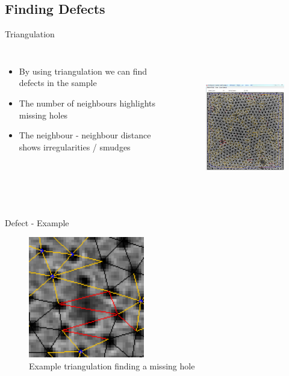 \documentclass{beamer}
\begin{document}
\subsection{Finding Defects}
\begin{frame}{Triangulation}
	\begin{columns}
			\begin{itemize}
				\item
				By using triangulation we can find defects in the sample
				\item
				The number of neighbours highlights missing holes
				\item
				The neighbour - neighbour distance shows irregularities / smudges
			\end{itemize}
			\begin{figure}
				\includegraphics[height=175pt]{images/triangulation.PNG}
			\end{figure}
	\end{columns}

\end{frame}

\begin{frame}{Defect - Example}
	\begin{figure}
		\includegraphics[height=150pt]{images/hole_defect_1.png}
		\caption{Example triangulation finding a missing hole}
	\end{figure}
\end{frame}
\end{document}
